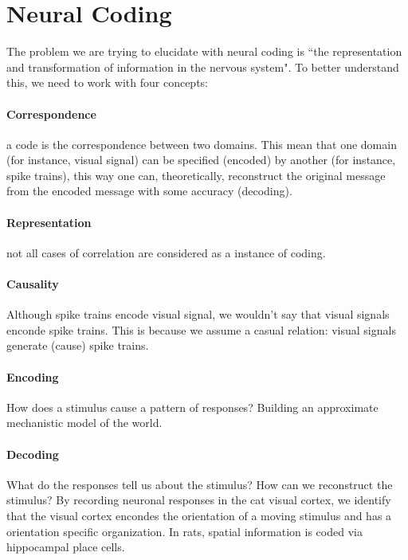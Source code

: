 \documentclass[main]{subfiles}
\begin{document}

\section{Neural Coding}

The problem we are trying to elucidate with neural coding is ``the representation and transformation of information in the nervous system".
To better understand this, we need to work with four concepts:

\paragraph{Correspondence} a code is the correspondence between two domains. This mean that one domain (for instance, visual signal) can be specified (encoded) by another (for instance, spike trains), this way one can, theoretically, reconstruct  the original message from the encoded message with some accuracy (decoding).

\paragraph{Representation} not all cases of correlation are considered as a instance of coding.

\paragraph{Causality} Although spike trains encode visual signal, we wouldn't say that visual signals enconde spike trains. This is because we assume a casual relation: visual signals generate (cause) spike trains.

\paragraph{Encoding} How does a stimulus cause a pattern of responses? Building an approximate mechanistic model of the world.

\paragraph{Decoding} What do the responses tell us about the stimulus? How can we reconstruct the stimulus?
By recording neuronal responses in the cat visual cortex, we identify that the visual cortex encondes the orientation of a moving stimulus and has a orientation specific organization.
In rats, spatial information is coded via hippocampal place cells.
\end{document}

